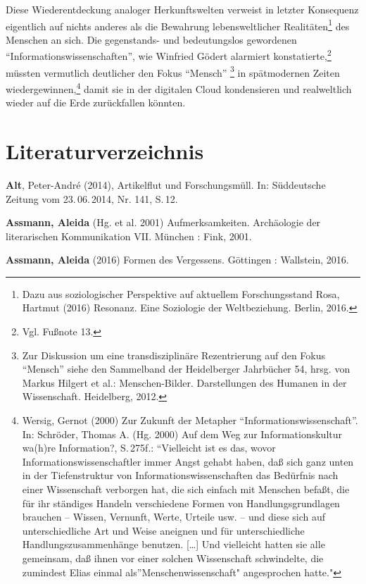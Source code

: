 \documentclass[a4paper,
fontsize=11pt,
oneside,
numbers=noperiodatend,
parskip=half-,
bibliography=totoc,
final
]{scrartcl}
\begin{document}
Diese Wiederentdeckung analoger Herkunftswelten verweist in letzter
Konsequenz eigentlich auf nichts anderes als die Bewahrung
lebensweltlicher Realitäten\footnote{Dazu aus soziologischer Perspektive
  auf aktuellem Forschungsstand Rosa, Hartmut (2016) Resonanz. Eine
  Soziologie der Weltbeziehung. Berlin, 2016.} des Menschen an sich. Die
gegenstands- und bedeutungslos gewordenen
\enquote{Informationswissenschaften}, wie Winfried Gödert alarmiert
konstatierte,\footnote{Vgl. Fußnote 13.} müssten vermutlich deutlicher
den Fokus \enquote{Mensch} \footnote{Zur Diskussion um eine
  transdisziplinäre Rezentrierung auf den Fokus \enquote{Mensch} siehe
  den Sammelband der Heidelberger Jahrbücher 54, hrsg. von Markus
  Hilgert et al.: Menschen-Bilder. Darstellungen des Humanen in der
  Wissenschaft. Heidelberg, 2012.} in spätmodernen Zeiten
wiedergewinnen,\footnote{Wersig, Gernot (2000) Zur Zukunft der Metapher
  \enquote{Informationswissenschaft}. In: Schröder, Thomas A. (Hg. 2000)
  Auf dem Weg zur Informationskultur wa(h)re Information?, S.\,275f.:
  \enquote{Vielleicht ist es das, wovor Informationswissenschaftler
  immer Angst gehabt haben, daß sich ganz unten in der Tiefenstruktur
  von Informationswissenschaften das Bedürfnis nach einer Wissenschaft
  verborgen hat, die sich einfach mit Menschen befaßt, die für ihr
  ständiges Handeln verschiedene Formen von Handlungsgrundlagen brauchen
  -- Wissen, Vernunft, Werte, Urteile usw. -- und diese sich auf
  unterschiedliche Art und Weise aneignen und für unterschiedliche
  Handlungszusammenhänge benutzen. {[}\ldots{}{]} Und vielleicht hatten
  sie alle gemeinsam, daß ihnen vor einer solchen Wissenschaft
  schwindelte, die zumindest Elias einmal als}Menschenwissenschaft"
  angesprochen hatte."} damit sie in der digitalen Cloud kondensieren
und realweltlich wieder auf die Erde zurückfallen könnten.

\section*{Literaturverzeichnis}\label{literaturverzeichnis}

\textbf{Alt}, Peter-André (2014), Artikelflut und Forschungsmüll. In:
Süddeutsche Zeitung vom 23.\,06.\,2014, Nr. 141, S.\,12.

\textbf{Assmann, Aleida} (Hg. et al. 2001) Aufmerksamkeiten. Archäologie
der literarischen Kommunikation VII. München : Fink, 2001.

\textbf{Assmann, Aleida} (2016) Formen des Vergessens. Göttingen :
Wallstein, 2016.
\end{document}
